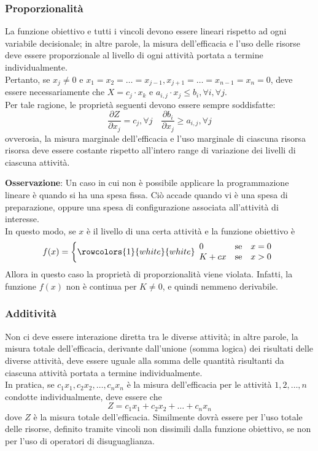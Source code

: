 \documentclass[a4paper]{extarticle}
\begin{document}
\vspace{1em}
\subsubsection{Proporzionalità}
La funzione obiettivo e tutti i vincoli devono essere lineari rispetto ad ogni variabile decisionale; in altre parole, la misura dell'efficacia e l'uso delle risorse deve essere proporzionale al livello di ogni attività portata a termine individualmente.\\
Pertanto, se $x_j \neq 0$ e $x_1=x_2=\dots=x_{j-1},x_{j+1}=\dots=x_{n-1}=x_n=0$, deve essere necessariamente che $X=c_j \cdot x_k$ e $a_{i,j} \cdot x_j \leq b_i, \forall i, \forall j$.\\
Per tale ragione, le proprietà seguenti devono essere sempre soddisfatte:
\[\frac{\partial Z}{\partial x_j} = c_j, \forall j \hspace{1em} \frac{\partial b_i}{\partial x_j} \geq a_{i,j}, \forall j\]
ovverosia, la misura marginale dell'efficacia e l'uso marginale di ciascuna risorsa risorsa deve essere costante rispetto all'intero range di variazione dei livelli di ciascuna attività.

\vspace{1em}
\noindent
\textbf{Osservazione}: Un caso in cui non è possibile applicare la programmazione lineare è quando si ha una spesa fissa. Ciò accade quando vi è una spesa di preparazione, oppure una spesa di configurazione associata all'attività di interesse.\\
In questo modo, se $x$ è il livello di una certa attività e la funzione obiettivo è
\[
    f(x) = \left\{
        \rowcolors{1}{white}{white}
        \begin{array}{lll}
            0 & \text{se} & x=0\\
            K+cx  & \text{se} & x>0
        \end{array}
    \right.
\]
Allora in questo caso la proprietà di proporzionalità viene violata. Infatti, la funzione $f(x)$ non è continua per $K \neq 0$, e quindi nemmeno derivabile.

\vspace{1em}
\subsubsection{Additività}
Non ci deve essere interazione diretta tra le diverse attività; in altre parole, la misura totale dell'efficacia, derivante dall'unione (somma logica) dei risultati delle diverse attività, deve essere uguale alla somma delle quantità risultanti da ciascuna attività portata a termine individualmente.\\
In pratica, se $c_1 x_1, c_2 x_2, \dots, c_n x_n$ è la misura dell'efficacia per le attività $1,2,\dots,n$ condotte individualmente, deve essere che
\[Z = c_1x_1+c_2x_2+\dots+c_nx_n\]
dove $Z$ è la misura totale dell'efficacia. Similmente dovrà essere per l'uso totale delle risorse, definito tramite vincoli non dissimili dalla funzione obiettivo, se non per l'uso di operatori di disuguaglianza.
\end{document}
